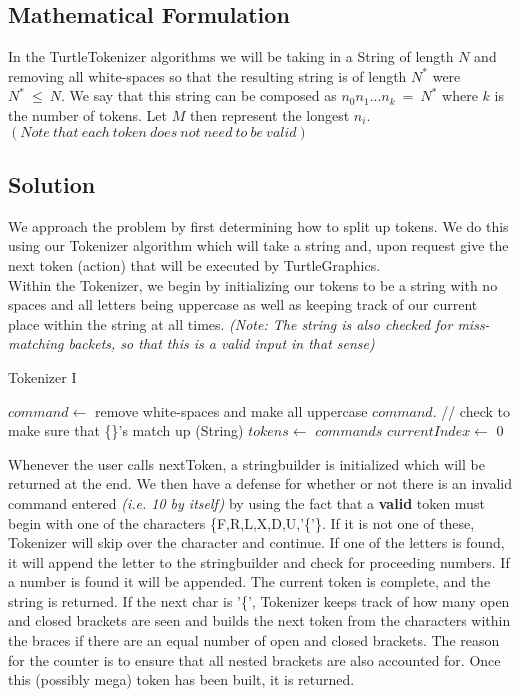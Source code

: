 \documentclass[12pt]{article}
\begin{document}
\subsection{Mathematical Formulation}
In the TurtleTokenizer algorithms we will be taking in a String of length $N$ and removing all
white-spaces so that the resulting string is of length $N^{*}$ were $N^{*}\ \leq\ N$. We say
that this string can be composed as $n_0n_1...n_k\ =\ N^{*}$ where $k$ is the number of tokens.
Let $M$ then represent the longest $n_i$. $(Note\ that\ each\ token\ does\ not\ need\ to\ be\
valid)$


\subsection{Solution}
We approach the problem by first determining how to split up tokens.  We do this using our
Tokenizer algorithm which will take a string and, upon request give the next token (action)
that will be executed by TurtleGraphics. \\
\indent Within the Tokenizer, we begin by initializing our tokens to be a string with no spaces and
all letters being uppercase as well as keeping track of our current place within the string
at all times. \textit{(Note: The string is also checked for miss-matching backets, so that this
is a valid input in that sense)}

\begin{algorithm}[H]
\caption{Tokenizer I}
\begin{algorithmic}
        \State $command \gets$ remove white-spaces and make all uppercase
        \State $command$.\Call{assertValidity}{ } // check to make sure that \{\}'s match up
        \State (String) $tokens \gets$ $commands$
        \State $currentIndex \gets$ 0
    \EndProcedure
\end{algorithmic}
\end{algorithm}

Whenever the user calls nextToken, a stringbuilder is initialized which will
be returned at the end. We then have a defense for whether or not there is an invalid command
entered \textit{(i.e. 10 by itself)} by using the fact that a \textbf{valid} token must begin
with one of the characters \{F,R,L,X,D,U,'\{'\}. If it is not one of these, Tokenizer will
skip over the character and continue. If one of the letters is found, it will append the letter
to the stringbuilder and check for proceeding numbers. If a number is found it will be appended.
The current token is complete, and the string is returned. If the next char is '\{', Tokenizer keeps
track of how many open and closed brackets are seen and builds the next token from the characters within
the braces if there are an equal number of open and closed brackets. The reason for the counter
is to ensure that all nested brackets are also accounted for. Once this (possibly mega) token has
been built, it is returned.
\end{document}
